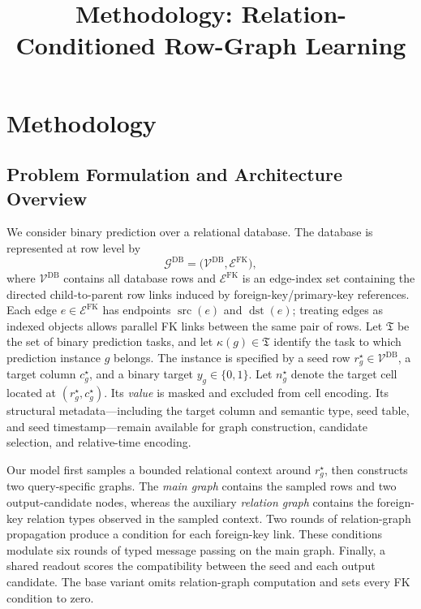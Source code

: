 \documentclass[11pt]{article}
\title{Methodology: Relation-Conditioned Row-Graph Learning}
\author{}
\date{}
\DeclareMathOperator{\src}{src}
\DeclareMathOperator{\dst}{dst}
\begin{document}
\maketitle

\section{Methodology}
\label{sec:methodology}

\subsection{Problem Formulation and Architecture Overview}
\label{sec:problem-overview}

We consider binary prediction over a relational database.  The database is
represented at row level by
\begin{equation}
    \mathcal G^{\mathrm{DB}}
    =
    \bigl(\mathcal V^{\mathrm{DB}},\mathcal E^{\mathrm{FK}}\bigr),
    \label{eq:database-graph}
\end{equation}
where \(\mathcal V^{\mathrm{DB}}\) contains all database rows and
\(\mathcal E^{\mathrm{FK}}\) is an edge-index set containing the directed
child-to-parent row links induced by foreign-key/primary-key references.
Each edge \(e\in\mathcal E^{\mathrm{FK}}\) has endpoints \(\src(e)\) and
\(\dst(e)\); treating edges as indexed objects allows parallel FK links
between the same pair of rows.  Let \(\mathfrak T\) be the set of binary
prediction tasks, and let \(\kappa(g)\in\mathfrak T\) identify the task to
which prediction instance \(g\) belongs.  The instance is specified by a seed row
\(r_g^\star\in\mathcal V^{\mathrm{DB}}\), a target column \(c_g^\star\), and
a binary target \(y_g\in\{0,1\}\).  Let \(n_g^\star\) denote the target cell
located at \((r_g^\star,c_g^\star)\).  Its \emph{value} is masked and
excluded from cell encoding.
Its structural metadata---including the target column and semantic type,
seed table, and seed timestamp---remain available for graph construction,
candidate selection, and relative-time encoding.

Our model first samples a bounded relational context around \(r_g^\star\),
then constructs two query-specific graphs.  The \emph{main graph} contains
the sampled rows and two output-candidate nodes, whereas the auxiliary
\emph{relation graph} contains the foreign-key relation types observed in
the sampled context.  Two rounds of relation-graph propagation produce a
condition for each foreign-key link.  These conditions modulate six rounds
of typed message passing on the main graph.  Finally, a shared readout scores
the compatibility between the seed and each output candidate.  The base
variant omits relation-graph computation and sets every FK condition to
zero.
\end{document}
